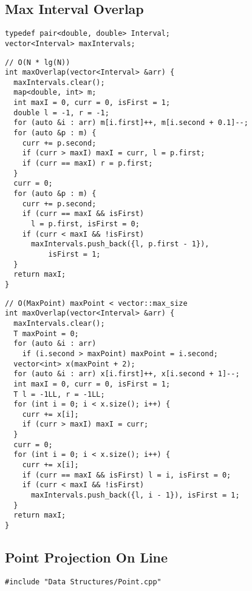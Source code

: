 \documentclass[twoside]{article}
\newcommand{\fileTitleStyle}{\large\underline}
\begin{document}
\begin{multicols*}{2}
\subsection*{Max Interval Overlap}
\begin{verbatim}
typedef pair<double, double> Interval;
vector<Interval> maxIntervals;
\end{verbatim}
\vspace{-12pt}
\begin{verbatim}
// O(N * lg(N))
int maxOverlap(vector<Interval> &arr) {
  maxIntervals.clear();
  map<double, int> m;
  int maxI = 0, curr = 0, isFirst = 1;
  double l = -1, r = -1;
  for (auto &i : arr) m[i.first]++, m[i.second + 0.1]--;
  for (auto &p : m) {
    curr += p.second;
    if (curr > maxI) maxI = curr, l = p.first;
    if (curr == maxI) r = p.first;
  }
  curr = 0;
  for (auto &p : m) {
    curr += p.second;
    if (curr == maxI && isFirst)
      l = p.first, isFirst = 0;
    if (curr < maxI && !isFirst)
      maxIntervals.push_back({l, p.first - 1}),
          isFirst = 1;
  }
  return maxI;
}
\end{verbatim}
\vspace{-12pt}
\begin{verbatim}
// O(MaxPoint) maxPoint < vector::max_size
int maxOverlap(vector<Interval> &arr) {
  maxIntervals.clear();
  T maxPoint = 0;
  for (auto &i : arr)
    if (i.second > maxPoint) maxPoint = i.second;
  vector<int> x(maxPoint + 2);
  for (auto &i : arr) x[i.first]++, x[i.second + 1]--;
  int maxI = 0, curr = 0, isFirst = 1;
  T l = -1LL, r = -1LL;
  for (int i = 0; i < x.size(); i++) {
    curr += x[i];
    if (curr > maxI) maxI = curr;
  }
  curr = 0;
  for (int i = 0; i < x.size(); i++) {
    curr += x[i];
    if (curr == maxI && isFirst) l = i, isFirst = 0;
    if (curr < maxI && !isFirst)
      maxIntervals.push_back({l, i - 1}), isFirst = 1;
  }
  return maxI;
}
\end{verbatim}

\subsectionfont{\centering\bfseries\LARGE}
\subsectionfont{\fileTitleStyle}
\subsection*{Point Projection On Line}
\begin{verbatim}
#include "Data Structures/Point.cpp"


\end{verbatim}
\end{multicols*}
\end{document}
